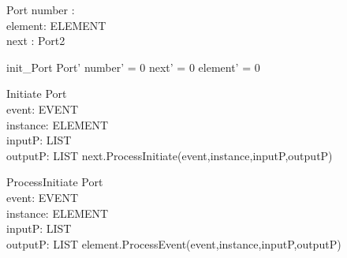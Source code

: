 \begin{schema}{Port}
number : \nat \\
element: ELEMENT \\
next : Port2
\end{schema}


\begin{zed}
init\_Port \sdef \lsch Port' \bbar number' = 0 \land next' = 0 \land element' = 0  \rsch  \end{zed}

\begin{schema}{Initiate}
\Delta Port \\
event: EVENT \\
instance: ELEMENT \\
inputP: LIST \\
outputP: LIST 
\where
next.ProcessInitiate(event,instance,inputP,outputP) 
\end{schema}

\begin{schema}{ProcessInitiate}
\Delta Port \\
event: EVENT \\
instance: ELEMENT \\
inputP: LIST \\
outputP: LIST 
\where
element.ProcessEvent(event,instance,inputP,outputP)
\end{schema}